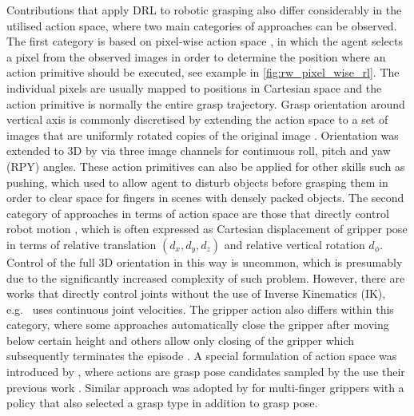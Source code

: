 Contributions that apply DRL to robotic grasping also differ considerably in the utilised action space, where two main categories of approaches can be observed. The first category is based on pixel-wise action space \cite{zeng_learning_2018, gualtieri_learning_2018, liu_active_2019, daniel_deep_2020, wu_generative_2020}, in which the agent selects a pixel from the observed images in order to determine the position where an action primitive should be executed, see example in \autoref{fig:rw_pixel_wise_rl}. The individual pixels are usually mapped to positions in Cartesian space and the action primitive is normally the entire grasp trajectory. Grasp orientation around vertical axis is commonly discretised by extending the action space to a set of images that are uniformly rotated copies of the original image \cite{zeng_learning_2018, daniel_deep_2020}. Orientation was extended to 3D by \citet{wu_generative_2020} via three image channels for continuous roll, pitch and yaw (RPY) angles. These action primitives can also be applied for other skills such as pushing, which \citet{zeng_learning_2018} used to allow agent to disturb objects before grasping them in order to clear space for fingers in scenes with densely packed objects. The second category of approaches in terms of action space are those that directly control robot motion \cite{quillen_deep_2018, kalashnikov_qt-opt_2018, breyer_comparing_2019, joshi_robotic_2020, zhan_framework_2020, kim_acceleration_2020, iqbal_toward_2020}, which is often expressed as Cartesian displacement of gripper pose in terms of relative translation $(d_x, d_y, d_z)$ and relative vertical rotation $d_\phi$. Control of the full 3D orientation in this way is uncommon, which is presumably due to the significantly increased complexity of such problem. However, there are works that directly control joints without the use of Inverse Kinematics (IK), e.g.~\citet{popov_data-efficient_2017} uses continuous joint velocities. The gripper action also differs within this category, where some approaches automatically close the gripper after moving below certain height \cite{quillen_deep_2018} and others allow only closing of the gripper which subsequently terminates the episode \cite{kalashnikov_qt-opt_2018, joshi_robotic_2020}. A special formulation of action space was introduced by \citet{gualtieri_pick_2018}, where actions are grasp pose candidates sampled by the use their previous work \citet{ten_pas_grasp_2017}. Similar approach was adopted by \citet{osa_experiments_2017} for multi-finger grippers with a policy that also selected a grasp type in addition to grasp pose.

